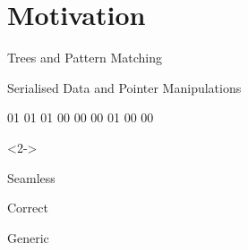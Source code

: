 
\section{Motivation}

\begin{frame}{Trees and Pattern Matching}
\begin{minipage}{.5\textwidth}

\end{minipage}\hfill
\begin{minipage}{.45\textwidth}
\end{minipage}
\end{frame}

\begin{frame}[fragile]{Serialised Data and Pointer Manipulations}
\begin{hexdump}
01 01 01 00  00  00  01 00  00
\end{hexdump}
\begin{overlayarea}{\linewidth}{6cm}
\begin{onlyenv}<2->

\end{onlyenv}
\end{overlayarea}
\end{frame}

\begin{frame}{Seamless}

  \vspace*{2em}

  \begin{minipage}{.6\textwidth}
  \end{minipage}\hfill

  \hfill\begin{minipage}{.6\textwidth}
  \end{minipage}
\end{frame}


\begin{frame}{Correct}
  \vfill
\end{frame}


\begin{frame}{Generic}

  \vspace*{2em}

\end{frame}
